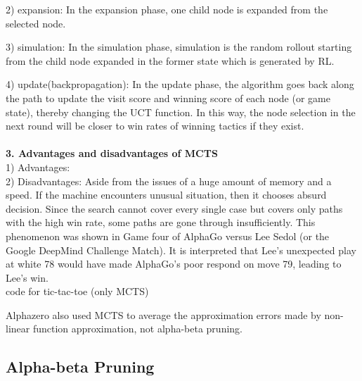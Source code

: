 \documentclass[11pt]{article}
\begin{document}
	
	2) expansion:
	In the expansion phase, one child node is expanded from the selected node. 	
	
	3) simulation: In the simulation phase, simulation is the random rollout starting from the child node expanded in the former state which is generated by RL.
	
	4) update(backpropagation): In the update phase, the algorithm goes back along the path to update the visit score and winning score of each node (or game state), thereby changing the UCT function. In this way, the node selection in the next round will be closer to win rates of winning tactics if they exist.\\
	\\
	\textbf{3. Advantages and disadvantages of MCTS}\\
1) Advantages: \\%
2) Disadvantages: Aside from the issues of a huge amount of memory and a speed. If the machine encounters unusual situation, then it chooses absurd decision. Since the search cannot cover every single case but covers only paths with the high win rate, some paths are gone through insufficiently. This phenomenon was shown in Game four of AlphaGo versus Lee Sedol (or the Google DeepMind Challenge Match). It is interpreted that Lee's unexpected play at white 78 would have made AlphaGo's poor respond on move 79, leading to Lee's win.\\

	code for tic-tac-toe (only MCTS)



%	
%	
%	
%	
	
	
	
	
	
	
	Alphazero also used MCTS to average the approximation errors made by non-linear function approximation, not alpha-beta pruning.
	
	\subsection{Alpha-beta Pruning}
	
\end{document}
